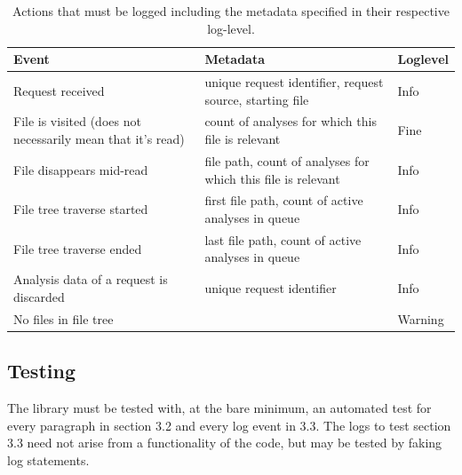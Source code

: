 \documentclass[11pt]{article} %
\begin{document}
    \begin{table}[H]
        \centering
        \begin{tabular}{p{.2\linewidth} | p{.5\linewidth} | p{.2\linewidth}}
            \textbf{Event}                                             & \textbf{Metadata}                                            & \textbf{Loglevel} \\\hline
            Request received                                           & unique request identifier, request source, starting file     & Info              \\\hline
            File is visited (does not necessarily mean that it's read) & count of analyses for which this file is relevant                     & Fine              \\\hline
            File disappears mid-read                                   & file path, count of analyses for which this file is relevant                     & Info              \\\hline
            File tree traverse started                                 & first file path, count of active analyses in queue           & Info              \\\hline
            File tree traverse ended                                   & last file path, count of active analyses in queue            & Info              \\\hline
            Analysis data of a request is discarded                    & unique request identifier                                    & Info              \\\hline
            No files in file tree                                      &                                                              & Warning
        \end{tabular}
        \caption{Actions that must be logged including the metadata specified in their respective log-level.}
        \label{tab:log_actions}
    \end{table}


    \subsection{Testing}\label{sec:3.3}

    The library must be tested with, at the bare minimum, an automated test for every paragraph in section 3.2 and every log event in 3.3. The logs to test section 3.3 need not arise from a functionality of the code, but may be tested by faking log statements.
\end{document}
